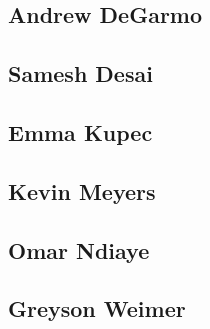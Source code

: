\subsection{Andrew DeGarmo}

\subsection{Samesh Desai}

\subsection{Emma Kupec}

\subsection{Kevin Meyers}

\subsection{Omar Ndiaye}

\subsection{Greyson Weimer}